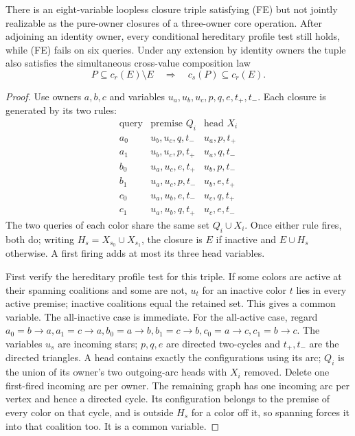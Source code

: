 \begin{theorem}
\label{core:thm:three-color-feedback}
There is an eight-variable loopless closure triple satisfying (FE)
but not jointly realizable as the pure-owner closures of a three-owner
core operation. After adjoining an identity owner, every conditional
hereditary profile test still holds, while (FE) fails on six queries.
Under any extension by identity owners the tuple also satisfies the
simultaneous cross-value composition law
\begin{equation}\label{core:eq:feedback-cross-composition}
 P\subseteq c_r(E)\setminus E\quad\Longrightarrow\quad
 c_s(P)\subseteq c_r(E).
\end{equation}
\end{theorem}
\begin{proof}
Use owners $a,b,c$ and variables
$u_a,u_b,u_c,p,q,e,t_+,t_-$. Each closure is generated by its two rules:
\[
\begin{array}{c|c|c}
\text{query}&\text{premise }Q_i&\text{head }X_i\\\hline
 a_0&u_b,u_c,q,t_-&u_a,p,t_+\\
 a_1&u_b,u_c,p,t_+&u_a,q,t_-\\
 b_0&u_a,u_c,e,t_+&u_b,p,t_-\\
 b_1&u_a,u_c,p,t_-&u_b,e,t_+\\
 c_0&u_a,u_b,e,t_-&u_c,q,t_+\\
 c_1&u_a,u_b,q,t_+&u_c,e,t_-
\end{array}
\]
The two queries of each color share the same set $Q_i\cup X_i$.
Once either rule fires, both do; writing $H_s=X_{s_0}\cup X_{s_1}$,
the closure is $E$ if inactive and $E\cup H_s$ otherwise.
A first firing adds at most its three head variables.

First verify the hereditary profile test for this triple. If some
colors are active at their spanning coalitions and some are not,
$u_t$ for an inactive color $t$ lies in every active premise;
inactive coalitions equal the retained set. This gives a common
variable. The all-inactive case is immediate.
For the all-active case, regard
$a_0=b\to a,a_1=c\to a,b_0=a\to b,b_1=c\to b,c_0=a\to c,c_1=b\to c$.
The variables $u_s$ are incoming stars; $p,q,e$ are directed two-cycles
and $t_+,t_-$ are the directed triangles. A head contains exactly the
configurations using its arc; $Q_i$ is the union of its owner's two
outgoing-arc heads with $X_i$ removed. Delete one first-fired incoming arc per
owner. The remaining graph has one incoming arc per vertex and hence
a directed cycle. Its configuration belongs to the premise of every
color on that cycle, and is outside $H_s$ for a color off it, so spanning
forces it into that coalition too. It is a common variable.


\end{proof}

